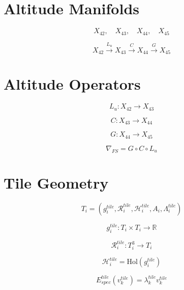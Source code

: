 

\section*{Altitude Manifolds}

\[
X_{42},\quad X_{43},\quad X_{44},\quad X_{45}
\]

\[
X_{42} \xrightarrow{L_u} X_{43} \xrightarrow{C} X_{44} 
\xrightarrow{G} X_{45}
\]


\section*{Altitude Operators}

\[
L_u : X_{42} \to X_{43}
\]

\[
C : X_{43} \to X_{44}
\]

\[
G : X_{44} \to X_{45}
\]

\[
\nabla_{FS} = G \circ C \circ L_u
\]


\section*{Tile Geometry}

\[
T_i = (g_i^{tile}, \mathcal{R}_i^{tile}, \mathcal{H}_i^{tile}, A_i, 
\Lambda_i^{tile})
\]

\[
g_i^{tile} : T_i \times T_i \to \mathbb{R}
\]

\[
\mathcal{R}_i^{tile} : T_i^3 \to T_i
\]

\[
\mathcal{H}_i^{tile} = \mathrm{Hol}(g_i^{tile})
\]

\[
E_{spec}^{tile}(v_k^{tile}) = \lambda_k^{tile} v_k^{tile}
\]


